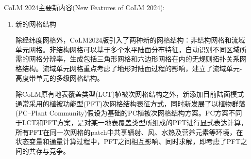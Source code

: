 CoLM 2024主要新内容(New Features of CoLM 2024):
\begin{enumerate}[label={\arabic*)}]
\item 新的网格结构

  除经纬度网格外，CoLM2024版引入了两种新的网格结构：非结构网格和流域单元网格。非结构网格可以基于多个水平陆面分布特征，自动识别不同区域所需的网格分辨率，生成包括三角形网格和六边形网格在内的无规则拓扑关系网格结构。流域单元网格重点考虑了地形对陆面过程的影响，建立了流域单元-高度带单元的多级网格结构。

  除CoLM原有地表覆盖类型(LCT)植被次网格结构之外，新添加目前陆面模式通常采用的植被功能型(PFT)次网格结构表征方式，同时新发展了以植物群落(PC--Plant Community)假设为基础的PC植被次网格结构方案。PC方案不同于LCT和PFT方案，是对某一地表覆盖类型所组成的PFT进行显式表达计算，所有PFT在同一次网格的patch中共享辐射、风、水热及营养元素等环境，在状态变量和通量计算过程中，PFT之间相互影响、同时求解，即考虑了PFT之间的共存与竞争。


\end{enumerate}
